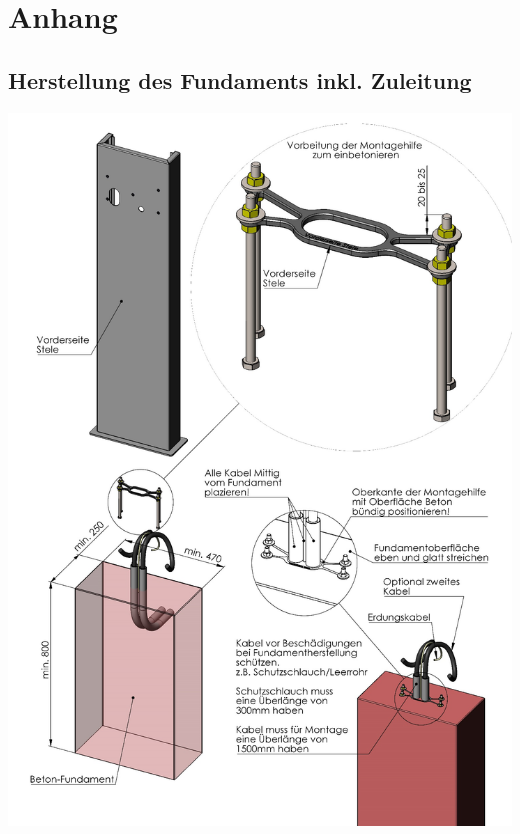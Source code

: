 \documentclass[a4paper,10pt]{article}
\begin{document}
	\section*{Anhang}

	\subsection*{Herstellung des Fundaments inkl. Zuleitung}
	\label{appendix_base}
	\begin{center}
		\includegraphics[width=0.9\linewidth]{./img/stand_overview}
	\end{center}
\end{document}

